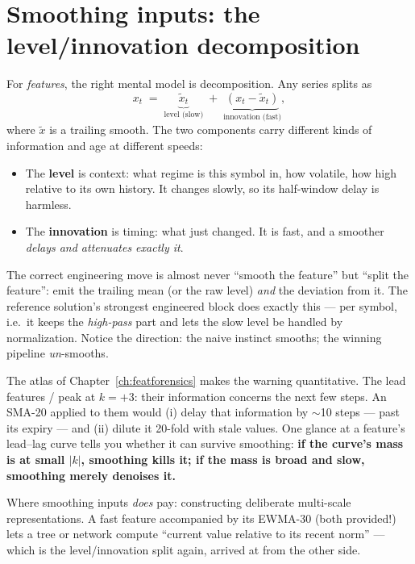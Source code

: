 \section{Smoothing inputs: the level/innovation decomposition}

For \emph{features}, the right mental model is decomposition. Any series
splits as
\[
x_t \;=\; \underbrace{\tilde x_t}_{\text{level (slow)}}
\;+\; \underbrace{(x_t - \tilde x_t)}_{\text{innovation (fast)}},
\]
where $\tilde x$ is a trailing smooth. The two components carry different
kinds of information and age at different speeds:

\begin{itemize}
\item The \textbf{level} is context: what regime is this symbol in, how
  volatile, how high relative to its own history. It changes slowly, so its
  half-window delay is harmless.
\item The \textbf{innovation} is timing: what just changed. It is fast, and
  a smoother \emph{delays and attenuates exactly it}.
\end{itemize}

\begin{keybox}
The correct engineering move is almost never ``smooth the feature'' but
``split the feature'': emit the trailing mean (or the raw level) \emph{and}
the deviation from it. The reference solution's strongest engineered block
does exactly this ---  per symbol,
i.e.\ it keeps the \emph{high-pass} part and lets the slow level be handled
by normalization. Notice the direction: the naive instinct smooths;
the winning pipeline \emph{un}-smooths.
\end{keybox}

The atlas of Chapter~\ref{ch:featforensics} makes the warning quantitative.
The lead features / peak at $k = +3$: their information
concerns the next few steps. An SMA-20 applied to them would (i) delay
that information by $\sim$10 steps --- past its expiry --- and (ii) dilute
it 20-fold with stale values. One glance at a feature's lead--lag curve
tells you whether it can survive smoothing: \textbf{if the curve's mass is
at small $|k|$, smoothing kills it; if the mass is broad and slow,
smoothing merely denoises it.}

Where smoothing inputs \emph{does} pay: constructing deliberate multi-scale
representations. A fast feature accompanied by its EWMA-30 (both provided!)
lets a tree or network compute ``current value relative to its recent
norm'' --- which is the level/innovation split again, arrived at from the
other side.

